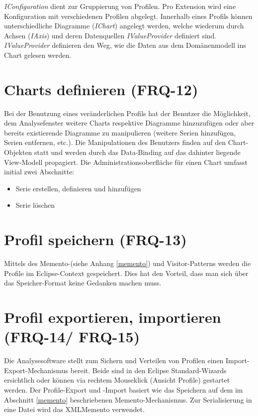 \textit{IConfiguration} dient zur Gruppierung von Profilen. Pro Extension wird eine Konfiguration mit verschiedenen Profilen abgelegt. Innerhalb eines Profils können unterschiedliche Diagramme (\textit{IChart}) angelegt werden, welche wiederum durch Achsen (\textit{IAxis}) und deren Datenquellen \textit{IValueProvider} definiert sind. \textit{IValueProvider} definieren den Weg, wie die Daten aus dem Domänenmodell ins Chart gelesen werden.

\section{Charts definieren (FRQ-12)}
Bei der Benutzung eines veränderlichen Profils hat der Benutzer die Möglichkeit, dem Analysefenster weitere Charts respektive Diagramme hinzuzufügen oder aber bereits existierende Diagramme zu manipulieren (weitere Serien hinzufügen, Serien entfernen, etc.). Die Manipulationen des Benutzers finden auf den Chart-Objekten statt und werden durch das Data-Binding auf das dahinter liegende View-Modell propagiert. Die Administrationsoberfläche für einen Chart umfasst initial zwei Abschnitte:
\begin{itemize}
	\item Serie erstellen, definieren und hinzufügen
	 \item Serie löschen
\end{itemize}

\section{Profil speichern (FRQ-13)}
Mittels des Memento-(siehe Anhang \ref{memento}) und Visitor-Patterns\cite[S. 331]{gamma1995design} werden die Profile im Eclipse-Context gespeichert. Dies hat den Vorteil, dass man sich über das Speicher-Format keine Gedanken machen muss.

\section{Profil exportieren, importieren (FRQ-14/ FRQ-15)}
Die Analysesoftware stellt zum Sichern und Verteilen von Profilen einen Import-Export-Mechanismus bereit. Beide sind in den Eclipse Standard-Wizards ersichtlich oder können via rechtem Mouseklick (Ansicht Profile) gestartet werden. Der Profile-Export und -Import basiert wie das Speichern auf dem im Abschnitt \ref{memento} beschriebenen Memento-Mechanismus. Zur Serialisierung in eine Datei wird das XMLMemento verwendet. 

